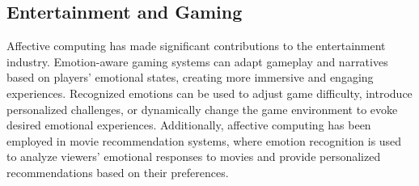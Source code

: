 \subsection{Entertainment and Gaming}
Affective computing has made significant contributions to the entertainment industry. 
Emotion-aware gaming systems can adapt gameplay and narratives based on players' emotional states, creating more immersive and engaging experiences.
Recognized emotions can be used to adjust game difficulty, introduce personalized challenges, or dynamically change the game environment to evoke desired emotional experiences. 
Additionally, affective computing has been employed in movie recommendation systems, where emotion recognition is used to analyze viewers' emotional 
responses to movies and provide personalized recommendations based on their preferences.